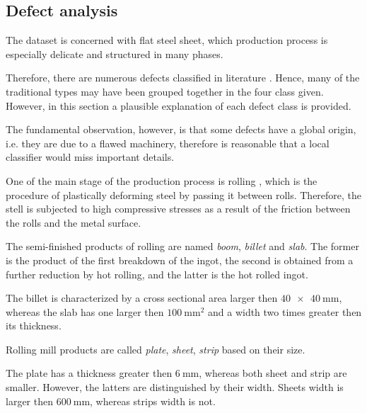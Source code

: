     \subsection{Defect analysis}\label{subsection:defects}
        \par{
            The dataset is concerned with flat steel sheet, which production process is especially delicate and structured in many phases.
        }
        \par{
            Therefore, there are numerous defects classified in literature \cite{defects:64common,defects:mainlinemetals}. Hence, many of the traditional types may have been grouped together in the four class given. However, in this section a plausible explanation of each defect class is provided.
        }
        \par{
            The fundamental observation, however, is that some defects have a global origin, i.e. they are due to a flawed machinery, therefore is reasonable that a local classifier would miss important details.
        }
        \par{
            One of the main stage of the production process is rolling \cite{wiki:rolling, defects:rolling}, which is the procedure of plastically deforming steel by passing it between rolls. Therefore, the stell is subjected to high compressive stresses as a result of the friction between the rolls and the metal surface.
        }
        \par{
            The semi-finished products of rolling are named \emph{boom}, \emph{billet} and \emph{slab}. The former is the product of the first breakdown of the ingot, the second is obtained from a further reduction by hot rolling, and the latter is the hot rolled ingot.
        }
        \par{
            The billet is characterized by a cross sectional area larger then $\SI[product-units=power]{40 x 40 }{\mm}$, whereas the slab has one larger then $\SI{100}{\mm\squared}$ and a width two times greater then its thickness.
        }
        \par{
            Rolling mill products are called \emph{plate}, \emph{sheet}, \emph{strip} based on their size.
        }
        \par{
            The plate has a thickness greater then $\SI{6}{\mm}$, whereas both sheet and strip are smaller. However, the latters are distinguished by their width. Sheets width is larger then $\SI{600}{\mm}$, whereas strips width is not.
        }
